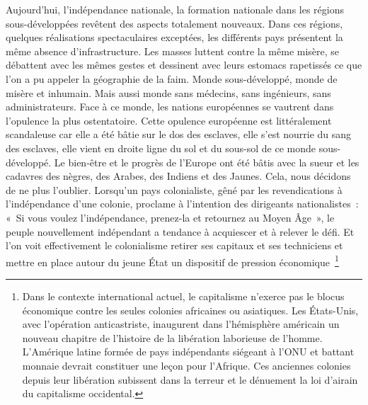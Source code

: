 \documentclass[french,twoside]{book} %
\begin{document}
\bigbreak
\noindent Aujourd’hui, l’indépendance nationale, la formation nationale dans les régions sous-développées revêtent des aspects totalement nouveaux. Dans ces régions, quelques réalisations spectaculaires exceptées, les différents pays présentent la même absence d’infrastructure. Les masses luttent contre la même misère, se débattent avec les mêmes gestes et dessinent avec leurs estomacs rapetissés ce que l’on a pu appeler la géographie de la faim. Monde sous-développé, monde de misère et inhumain. Mais aussi monde sans médecins, sans ingénieurs, sans administrateurs. Face à ce monde, les nations européennes se vautrent dans l’opulence la plus ostentatoire. Cette opulence européenne est littéralement scandaleuse car elle a été bâtie sur le dos des esclaves, elle s’est nourrie du sang des esclaves, elle vient en droite ligne du sol et du sous-sol de ce monde sous-développé. Le bien-être et le progrès de l’Europe ont été bâtis avec la sueur et les cadavres des nègres, des Arabes, des Indiens et des Jaunes. Cela, nous décidons de ne plus l’oublier. Lorsqu’un pays colonialiste, gêné par les revendications à l’indépendance d’une colonie, proclame à l’intention des dirigeants nationalistes : « Si vous voulez l’indépendance, prenez-la et retournez au Moyen Âge », le peuple nouvellement indépendant a tendance à acquiescer et à relever le défi. Et l’on voit effectivement le colonialisme retirer ses capitaux et ses techniciens et mettre en place autour du jeune État un dispositif de pression   économique \footnote{ \noindent Dans le contexte international actuel, le capitalisme n’exerce pas le blocus économique contre les seules colonies africaines ou asiatiques. Les États-Unis, avec l’opération anticastriste, inaugurent dans l’hémisphère américain un nouveau chapitre de l’histoire de la libération laborieuse de l’homme. L’Amérique latine formée de pays indépendants siégeant à l’ONU et battant monnaie devrait constituer une leçon pour l’Afrique. Ces anciennes colonies depuis leur libération subissent dans la terreur et le dénuement la loi d’airain du capitalisme occidental.\par
}
\end{document}
